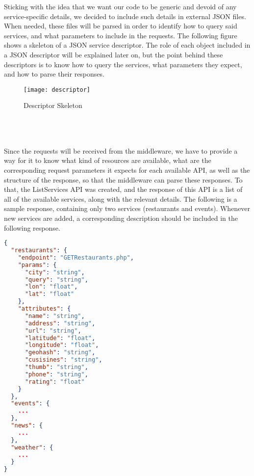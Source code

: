 Sticking with the idea that we want our code to be generic and devoid of any service-specific details, we decided to include such details in external JSON files. When needed, these files will be parsed in order to identify how to query said services, and what parameters to include in the requests. The following figure shows a skeleton of a JSON service descriptor. The role of each object included in a JSON descriptor will be explained later on, but the point behind these descriptors is to know how to query the services, what parameters they expect, and how to parse their responses.
\begin{figure}[h]
\centering
\texttt{[image: descriptor]}
\caption{Descriptor Skeleton}
\end{figure}
\\\\\\
Since the requests will be received from the middleware, we have to provide a way for it to know what kind of resources are available, what are the corresponding request parameters it expects for each available API, as well as the structure of the response, so that the middleware can parse these responses. To that, the ListServices API was created, and the response of this API is a list of all of the available services, along with the relevant details. The following is a sample response, containing only two services (restaurants and events). Whenever new services are added, a corresponding description should be included in the following response.
\newpage
\begin{lstlisting}[language=json,firstnumber=1]
{
  "restaurants": {
    "endpoint": "GETRestaurants.php",
    "params": {
      "city": "string",
      "query": "string",
      "lon": "float",
      "lat": "float"
    },
    "attributes": {
      "name": "string",
      "address": "string",
      "url": "string",
      "latitude": "float",
      "longitude": "float",
      "geohash": "string",
      "cusisines": "string",
      "thumb": "string",
      "phone": "string",
      "rating": "float"
    }
  },
  "events": {
    ...
  },
  "news": {
    ...
  },
  "weather": {
    ...
  }
}
\end{lstlisting}
\pagebreak
